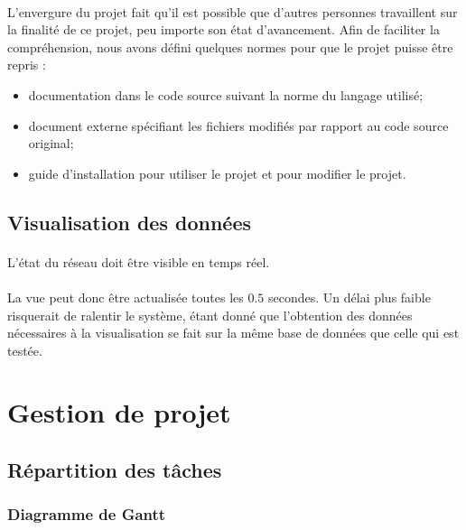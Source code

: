 \documentclass[12pt]{article}
\begin{document}
\paragraph{} L'envergure du projet fait qu'il est possible que d'autres personnes travaillent sur la finalité de ce projet, peu importe son état d'avancement.
Afin de faciliter la compréhension, nous avons défini quelques normes pour que le projet puisse être repris :
\begin{itemize}
	\item documentation dans le code source suivant la norme du langage utilisé;
	\item document externe spécifiant les fichiers modifiés par rapport au code source original;
	\item guide d'installation pour utiliser le projet et pour modifier le projet.
\end{itemize}

\subsection{Visualisation des données}

\paragraph{} L'état du réseau doit être visible en temps réel.

\paragraph{} La vue peut donc être actualisée toutes les $0.5$ secondes. 
Un délai plus faible risquerait de ralentir le système, étant donné que l'obtention des données nécessaires à la visualisation se fait sur la même base de données que celle qui est testée.


\newpage
\section{Gestion de projet}

\subsection{Répartition des tâches}

\subsubsection{Diagramme de Gantt}
\end{document}
